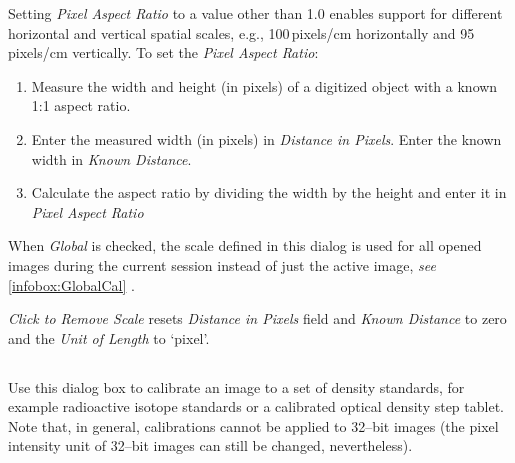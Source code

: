 \medskip{}
Setting \emph{Pixel Aspect Ratio} to a value other than 1.0 enables
support for different horizontal and vertical spatial scales, e.g.,
100\,pixels/cm horizontally and 95\,pixels/cm vertically. To set
the \emph{Pixel Aspect Ratio}:
\begin{enumerate}
\item Measure the width and height (in pixels) of a digitized object with
a known 1:1 aspect ratio.
\item Enter the measured width (in pixels) in \emph{Distance in Pixels}.
Enter the known width in \emph{Known Distance}.
\item Calculate the aspect ratio by dividing the width by the height and
enter it in \emph{Pixel Aspect Ratio}
\end{enumerate}
When \emph{Global} is checked, the scale defined in this dialog is
used for all opened images during the current session instead of just
the active image, \emph{see} \ref{infobox:GlobalCal} .

\emph{Click to Remove Scale} resets \emph{Distance in Pixels} field
and \emph{Known Distance} to zero and the \emph{Unit of Length} to
`pixel'.




\subsection[\protect\userinterface{Calibrate\ldots{}}]{\protect{}\label{sub:Calibrate...}\improvement{}}

Use
this dialog box to calibrate an image to a set of density standards,
for example radioactive isotope standards or a calibrated optical
density step tablet. Note that, in general, calibrations cannot be
applied to 32--bit images (the pixel intensity unit of 32--bit images
can still be changed, nevertheless).

